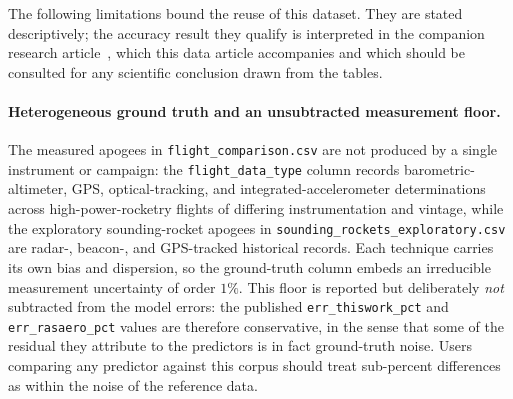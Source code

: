 
The following limitations bound the reuse of this dataset. They are stated
descriptively; the accuracy result they qualify is interpreted in the companion
research article~\cite{yu2026jsr}, which this data article accompanies and which
should be consulted for any scientific conclusion drawn from the tables.

\paragraph{Heterogeneous ground truth and an unsubtracted measurement floor.}
The measured apogees in \texttt{flight\_comparison.csv} are not produced by a
single instrument or campaign: the \texttt{flight\_data\_type} column records
barometric-altimeter, GPS, optical-tracking, and integrated-accelerometer
determinations across high-power-rocketry flights of differing instrumentation
and vintage, while the exploratory sounding-rocket apogees in
\texttt{sounding\_rockets\_exploratory.csv} are radar-, beacon-, and GPS-tracked
historical records. Each technique carries its own bias and dispersion, so the
ground-truth column embeds an irreducible measurement uncertainty of order
$1\%$. This floor is reported but deliberately \emph{not} subtracted from the
model errors: the published \texttt{err\_thiswork\_pct} and
\texttt{err\_rasaero\_pct} values are therefore conservative, in the sense that
some of the residual they attribute to the predictors is in fact ground-truth
noise. Users comparing any predictor against this corpus should treat
sub-percent differences as within the noise of the reference data.

